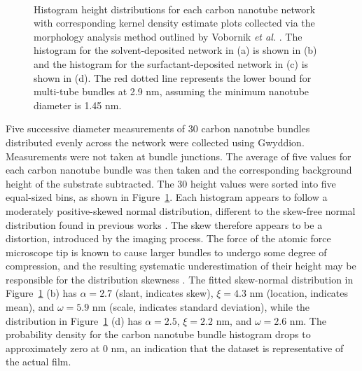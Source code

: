 \documentclass[
  a4paper,
]{scrbook}
\begin{document}
\begin{figure}
\begin{minipage}[t]{0.45\linewidth}
\end{minipage}%
%
\begin{minipage}[t]{0.01\linewidth}

{\centering 

~

}

\end{minipage}%

\caption[Histogram height distributions for each carbon nanotube network
with corresponding kernel density estimate
plots.]{\label{fig-cnt-histogram}Histogram height distributions for each
carbon nanotube network with corresponding kernel density estimate plots
collected via the morphology analysis method outlined by Vobornik
\emph{et al.} \autocite{Vobornik2023}. The histogram for the
solvent-deposited network in (a) is shown in (b) and the histogram for
the surfactant-deposited network in (c) is shown in (d). The red dotted
line represents the lower bound for multi-tube bundles at 2.9 nm,
assuming the minimum nanotube diameter is 1.45 nm.}

\end{figure}

Five successive diameter measurements of 30 carbon nanotube bundles
distributed evenly across the network were collected using Gwyddion.
Measurements were not taken at bundle junctions. The average of five
values for each carbon nanotube bundle was then taken and the
corresponding background height of the substrate subtracted. The 30
height values were sorted into five equal-sized bins, as shown in
Figure~\ref{fig-cnt-histogram}. Each histogram appears to follow a
moderately positive-skewed normal distribution, different to the
skew-free normal distribution found in previous works
\autocite{LeMieux2008,Liu2013,Vobornik2023}. The skew therefore appears
to be a distortion, introduced by the imaging process. The force of the
atomic force microscope tip is known to cause larger bundles to undergo
some degree of compression, and the resulting systematic underestimation
of their height may be responsible for the distribution skewness
\autocite{Vobornik2023}. The fitted skew-normal distribution in
Figure~\ref{fig-cnt-histogram} (b) has \(\alpha = 2.7\) (slant,
indicates skew), \(\xi = 4.3\) nm (location, indicates mean), and
\(\omega = 5.9\) nm (scale, indicates standard deviation), while the
distribution in Figure~\ref{fig-cnt-histogram} (d) has \(\alpha = 2.5\),
\(\xi = 2.2\) nm, and \(\omega = 2.6\) nm. The probability density for
the carbon nanotube bundle histogram drops to approximately zero at 0
nm, an indication that the dataset is representative of the actual film.
\end{document}

